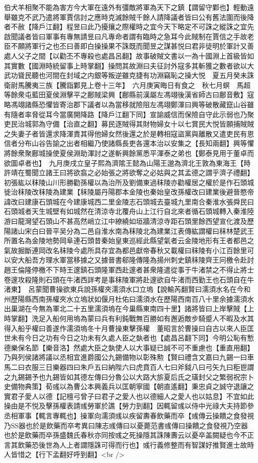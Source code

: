 伯犬羊相聚不能為害方今大軍在遠外有彊敵將軍為天下之鎮【謂留守鄴也】輕動遠舉雖克不武乃遣將軍賈信討之應時克滅餘賊千餘人請降議者皆曰公有舊法圍而後降者不赦【降戶江翻】程昱曰此乃擾攘之際權時之宜今天下略定不可誅之縱誅之宜先啟聞議者皆曰軍事有專無請昱曰凡專命者謂有臨時之急耳今此賊制在賈信之手故老臣不願將軍行之也丕曰善即白操操果不誅既而聞昱之謀甚悦曰君非徒明於軍計又善處人父子之間【以勸丕不專殺也處昌呂翻】故事破賊文書以一為十國淵上首級皆如其實數【國淵時統留事上時掌翻】操問其故淵曰夫征討外寇多其斬獲之數者欲以大武功聳民聽也河間在封域之内銀等叛逆雖克捷有功淵竊恥之操大悦　夏五月癸未誅衛尉馬騰夷三族【騰詣鄴見上卷十三年】　六月庚寅晦日有食之　秋七月螟　馬超等餘衆屯藍田夏侯淵擊平之鄜賊梁興【鄜縣前漢屬左馮翊後漢省師古曰鄜音敷】寇略馮翊諸縣恐懼皆寄治郡下議者以為當移就險阻左馮翊鄭渾曰興等破散藏竄山谷雖有隨者率脅從耳今當廣開降路【降戶江翻下同】宣諭威信而保險自守此示弱也乃聚吏民治城郭為守備【治直之翻】募民逐賊得其財物婦女十以七賞民大悦皆願捕賊賊之失妻子者皆還求降渾責其得他婦女然後還之於是轉相寇盜黨與離散又遣吏民有恩信者分布山谷告諭之出者相繼乃使諸縣長吏各還本治以安集之【長知兩翻】興等懼將餘衆聚鄜城操使夏侯淵助渾討之遂斬興餘黨悉平渾泰之弟也【鄭泰見用于董卓而欲圖卓者也】　九月庚戌立皇子熙為濟隂王懿為山陽王邈為濟北王敦為東海王【時許靖在蜀聞立諸王曰將欲翕之必始張之將欲奪之必姑與之其孟德之謂乎濟子禮翻】　初張紘以秣陵山川形勝勸孫權以為治所及劉備東過秣陵亦勸權居之權於是作石頭城徙治秣陵改秣陵為建業【秣陵屬丹陽郡本金陵也秦始皇改孫權改曰建業後避晉愍帝諱改曰建康石頭城在今建康城西二里金陵志石頭城去臺城九里南合秦淮水張舜民曰石頭城者天生城壁有如城然在清涼寺北覆舟山上江行自北來者循石頭城轉入秦淮陸游曰龍灣望石頭山不甚高然峭立江中繚繞如垣牆清涼寺距石頭里餘西望宣化渡及歷陽諸山宋白曰晉平吴分為二邑自淮水南為秣陵北為建業江表傳紘謂權曰秣林楚武王所置名為金陵地勢岡阜連石頭昔秦始皇東巡經此縣望氣者云金陵地形有王者都邑之氣故掘斷連岡改名秣陵今處所具存宜為都邑獻帝春秋又載權曰秣陵有小江百餘里可以安大船吾方理水軍當移據之又據晉書郗隆傳隆為揚州刺史鎮秣陵齊王冋檄令赴討趙王倫隆停檄不下時王邃鎮石頭隆軍西赴邃者甚衆隆遣從事于牛渚禁之不得止將士卷邃攻殺隆則石頭在牛渚西詳考是事秣陵軍將赴邃欲自牛渚而西勤王也石頭自在牛渚東】　呂蒙聞曹操欲東兵說孫權夾濡須水口立塢【說輸芮翻賢曰濡須水名在今和州歷陽縣西南孫權夾水立塢狀如偃月杜佑曰濡須水在歷陽西南百八十里余據濡須水出巢湖在今無為軍北二十五里濡須塢在今巢縣東南四十里】諸將皆曰上岸擊賊【上時掌翻】洗足入船何用塢為蒙曰兵有利鈍戰無百勝如有邂逅敵步騎蹙人不暇及水其得入船乎權曰善遂作濡須塢冬十月曹操東擊孫權　董昭言於曹操曰自古以來人臣匡世未有今日之功有今日之功未有久處人臣之埶者也【處昌呂翻下同】今明公恥有慙德樂保名節【樂音洛】然處大臣之埶使人以大事疑已誠不可不重慮也【重直用翻】乃與列侯諸將議以丞相宜進爵國公九錫備物以彰殊勲【賢曰禮含文嘉曰九錫一曰車馬二曰衣服三日樂器四曰朱戶五曰納陛六曰虎賁百人七曰斧鉞八曰弓矢九曰秬鬯謂之九錫錫予也九錫皆如其德左傳曰分魯公以大路大旂夏后氏之璜封父之繁弱祝宗卜史備物典策】荀彧以為曹公本興義兵以匡朝寧國【朝直遙翻】秉忠貞之誠守退讓之實君子愛人以德【記檀弓曾子曰君子之愛人也以德細人之愛人也以姑息】不宜如此操由是不悦及擊孫權表請彧勞軍於譙【勞力到翻】因輒留彧以侍中光祿大夫持節參丞相軍事【輒言專輒也】操軍向濡須彧以疾留夀春飲藥而卒【彧傳云操饋之食發視乃器也於是飲藥而卒考異曰陳志彧傳曰以憂薨范書彧傳曰操饋之食發視乃空器也於是飲藥而卒孫盛魏氏春秋亦同按彧之死操隱其誅陳夀云以憂卒盖闕疑也今不正言其飲藥恐後世為人上者謂隱誅可得而行也】彧行義修整而有智謀好推賢進士故時人皆惜之【行下孟翻好呼到翻】<br />
